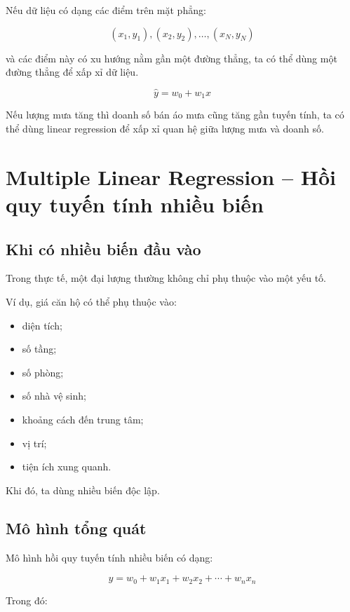 Nếu dữ liệu có dạng các điểm trên mặt phẳng:

\[
    (x_1,y_1),(x_2,y_2),\ldots,(x_N,y_N)
\]

và các điểm này có xu hướng nằm gần một đường thẳng, ta có thể dùng một đường thẳng để xấp xỉ dữ liệu.

\[
    \hat{y}=w_0+w_1x
\]

\begin{vidu}
Nếu lượng mưa tăng thì doanh số bán áo mưa cũng tăng gần tuyến tính, ta có thể dùng linear regression để xấp xỉ quan hệ giữa lượng mưa và doanh số.
\end{vidu}

\section{Multiple Linear Regression -- Hồi quy tuyến tính nhiều biến}

\subsection{Khi có nhiều biến đầu vào}

Trong thực tế, một đại lượng thường không chỉ phụ thuộc vào một yếu tố.

Ví dụ, giá căn hộ có thể phụ thuộc vào:

\begin{itemize}
    \item diện tích;
    \item số tầng;
    \item số phòng;
    \item số nhà vệ sinh;
    \item khoảng cách đến trung tâm;
    \item vị trí;
    \item tiện ích xung quanh.
\end{itemize}

Khi đó, ta dùng nhiều biến độc lập.

\subsection{Mô hình tổng quát}

Mô hình hồi quy tuyến tính nhiều biến có dạng:

\[
    \hat{y}
    =
    w_0
    +
    w_1x_1
    +
    w_2x_2
    +
    \cdots
    +
    w_nx_n
\]

Trong đó:

